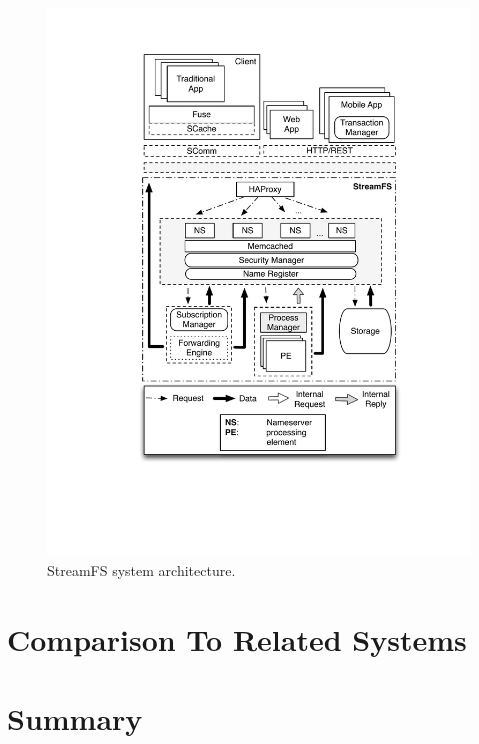 %



\begin{figure}[t!] %
\centering
\includegraphics[width=0.75\columnwidth]{figs/sfsarch}
\caption{StreamFS system architecture.}
\label{fig:sfsarch}
\end{figure}




\section{Comparison To Related Systems}


\section{Summary}




